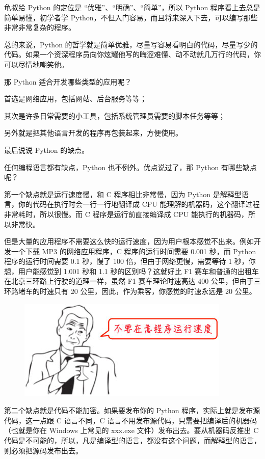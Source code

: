 龟叔给 Python 的定位是 ``优雅''、``明确''、``简单''，所以 Python
程序看上去总是简单易懂，初学者学
Python，不但入门容易，而且将来深入下去，可以编写那些非常非常复杂的程序。

总的来说，Python
的哲学就是简单优雅，尽量写容易看明白的代码，尽量写少的代码。如果一个资深程序员向你炫耀他写的晦涩难懂、动不动就几万行的代码，你可以尽情地嘲笑他。

那 Python 适合开发哪些类型的应用呢？

首选是网络应用，包括网站、后台服务等等；

其次是许多日常需要的小工具，包括系统管理员需要的脚本任务等等；

另外就是把其他语言开发的程序再包装起来，方便使用。

最后说说 Python 的缺点。

任何编程语言都有缺点，Python 也不例外。优点说过了，那 Python
有哪些缺点呢？

第一个缺点就是运行速度慢，和 C 程序相比非常慢，因为 Python
是解释型语言，你的代码在执行时会一行一行地翻译成 CPU
能理解的机器码，这个翻译过程非常耗时，所以很慢。而 C
程序是运行前直接编译成 CPU 能执行的机器码，所以非常快。

但是大量的应用程序不需要这么快的运行速度，因为用户根本感觉不出来。例如开发一个下载
MP3 的网络应用程序，C 程序的运行时间需要 0.001 秒，而 Python
程序的运行时间需要 0.1 秒，慢了 100 倍，但由于网络更慢，需要等待 1
秒，你想，用户能感觉到 1.001 秒和 1.1 秒的区别吗？这就好比 F1
赛车和普通的出租车在北京三环路上行驶的道理一样，虽然 F1 赛车理论时速高达
400 公里，但由于三环路堵车的时速只有 20
公里，因此，作为乘客，你感觉的时速永远是 20 公里。

 
 \begin{figure}[htp]
	\centering
	\includegraphics[width=0.6\linewidth]{fig/9230247568328960.png}
\end{figure}


第二个缺点就是代码不能加密。如果要发布你的 Python
程序，实际上就是发布源代码，这一点跟 C 语言不同，C
语言不用发布源代码，只需要把编译后的机器码（也就是你在 Windows 上常见的
xxx.exe 文件）发布出去。要从机器码反推出 C
代码是不可能的，所以，凡是编译型的语言，都没有这个问题，而解释型的语言，则必须把源码发布出去。

